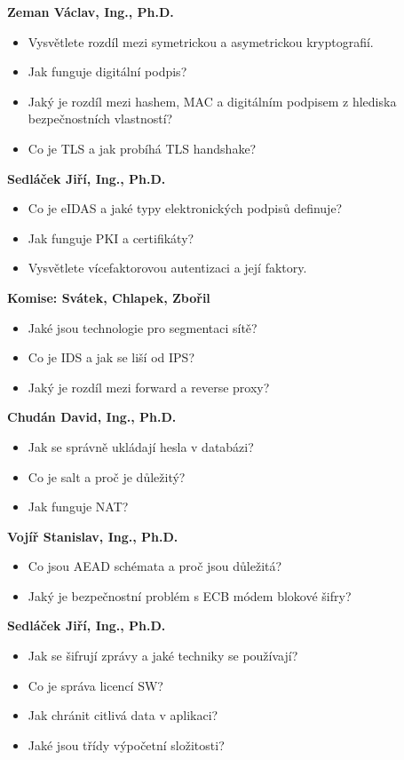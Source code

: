 \begin{profesorbox}
\textbf{Zeman Václav, Ing., Ph.D.}
\begin{itemize}
  \item Vysvětlete rozdíl mezi symetrickou a asymetrickou kryptografií.
  \item Jak funguje digitální podpis?
  \item Jaký je rozdíl mezi hashem, MAC a digitálním podpisem z hlediska bezpečnostních vlastností?
  \item Co je TLS a jak probíhá TLS handshake?
\end{itemize}
\textbf{Sedláček Jiří, Ing., Ph.D.}
\begin{itemize}
  \item Co je eIDAS a jaké typy elektronických podpisů definuje?
  \item Jak funguje PKI a certifikáty?
  \item Vysvětlete vícefaktorovou autentizaci a její faktory.
\end{itemize}
\textbf{Komise: Svátek, Chlapek, Zbořil}
\begin{itemize}
  \item Jaké jsou technologie pro segmentaci sítě?
  \item Co je IDS a jak se liší od IPS?
  \item Jaký je rozdíl mezi forward a reverse proxy?
\end{itemize}
\textbf{Chudán David, Ing., Ph.D.}
\begin{itemize}
  \item Jak se správně ukládají hesla v databázi?
  \item Co je salt a proč je důležitý?
  \item Jak funguje NAT?
\end{itemize}
\textbf{Vojíř Stanislav, Ing., Ph.D.}
\begin{itemize}
  \item Co jsou AEAD schémata a proč jsou důležitá?
  \item Jaký je bezpečnostní problém s ECB módem blokové šifry?
\end{itemize}
\textbf{Sedláček Jiří, Ing., Ph.D.}
\begin{itemize}
  \item Jak se šifrují zprávy a jaké techniky se používají?
  \item Co je správa licencí SW?
  \item Jak chránit citlivá data v aplikaci?
  \item Jaké jsou třídy výpočetní složitosti?

\end{itemize}
\end{profesorbox}
